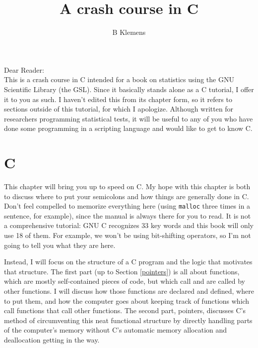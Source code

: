 \documentclass[12pt]{article}
\begin{document}
	\title{A crash course in C}
	\author{B Klemens}
	\maketitle


Dear Reader:\\
This is a crash course in C intended for a book on statistics using the
GNU Scientific Library (the GSL).  Since it basically stands alone as a
C tutorial, I offer it to you as such. I haven't edited this from
its chapter form, so it refers to sections outside of this tutorial,
for which I apologize. Although written for researchers programming
statistical tests, it will be useful to any of you who have done some
programming in a scripting language and would like to get to know C.

\vskip 1cm

\section{C}
\fi


\long{}

\long{}

This chapter will bring you up to speed on C.  
My hope with this chapter is both to discuss where to put your semicolons
and how things are generally done in C. Don't feel compelled to memorize
everything here (using {\tt malloc} three times in a sentence, for
example), since the manual is always there for you to read.  It is not
a comprehensive tutorial: GNU C recognizes 33 key words and this book
will only use 18 of them. For example, we won't be using bit-shifting
operators, so I'm not going to tell you what they are here.

Instead, I will focus on the structure of a C program and the logic that
motivates that structure.  The first part (up to Section \ref{pointers})
is all about functions, which are mostly self-contained pieces of code,
but which call and are called by other functions. I will discuss how
those functions are declared and defined, where to put them, and how the
computer goes about keeping track of functions which call functions that
call other functions. The second part, pointers, discusses C's method
of circumventing this neat functional structure by directly handling
parts of the computer's memory without C's automatic memory allocation
and deallocation getting in the way.
\end{document}
